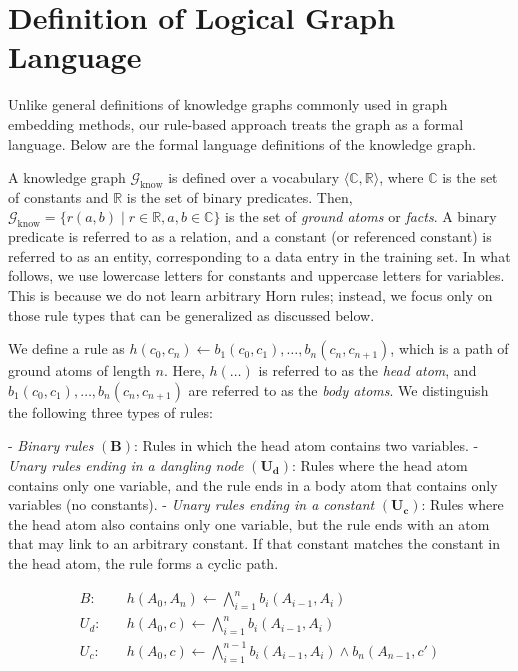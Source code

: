 \section{Definition of Logical Graph Language} \label{kg}

Unlike general definitions of knowledge graphs commonly used in graph embedding methods, our rule-based approach treats the graph as a formal language. Below are the formal language definitions of the knowledge graph.

A knowledge graph \(\mathcal{G}_{\text{know}}\) is defined over a vocabulary \(\langle \mathbb{C}, \mathbb{R} \rangle\), where \(\mathbb{C}\) is the set of constants and \(\mathbb{R}\) is the set of binary predicates. Then, \(\mathcal{G}_{\text{know}} = \{r(a, b) \mid r \in \mathbb{R}, a, b \in \mathbb{C}\}\) is the set of \textit{ground atoms} or \textit{facts}. A binary predicate is referred to as a relation, and a constant (or referenced constant) is referred to as an entity, corresponding to a data entry in the training set. In what follows, we use lowercase letters for constants and uppercase letters for variables. This is because we do not learn arbitrary Horn rules; instead, we focus only on those rule types that can be generalized as discussed below.

We define a rule as \(h(c_0, c_n) \gets b_1(c_0, c_1), \dots, b_n(c_{n}, c_{n + 1})\), which is a path of ground atoms of length \(n\). Here, \(h(\dots)\) is referred to as the \textit{head atom}, and \(b_1(c_0, c_1), \dots, b_n(c_{n}, c_{n + 1})\) are referred to as the \textit{body atoms}. We distinguish the following three types of rules:

- \textit{Binary rules} \((\mathbf{B})\): Rules in which the head atom contains two variables.
- \textit{Unary rules ending in a dangling node} \((\mathbf{U_d})\): Rules where the head atom contains only one variable, and the rule ends in a body atom that contains only variables (no constants).
- \textit{Unary rules ending in a constant} \((\mathbf{U_c})\): Rules where the head atom also contains only one variable, but the rule ends with an atom that may link to an arbitrary constant. If that constant matches the constant in the head atom, the rule forms a cyclic path.


\begin{equation}
	\begin{aligned}
		B: \quad & h(A_0, A_n) \gets \bigwedge_{i=1}^{n} b_i(A_{i-1}, A_i) \\
		U_d: \quad & h(A_0, c) \gets \bigwedge_{i=1}^{n} b_i(A_{i-1}, A_i) \\
		U_c: \quad & h(A_0, c) \gets \bigwedge_{i=1}^{n-1} b_i(A_{i-1}, A_i) \wedge b_n(A_{n-1}, c')
	\end{aligned}
\end{equation}


